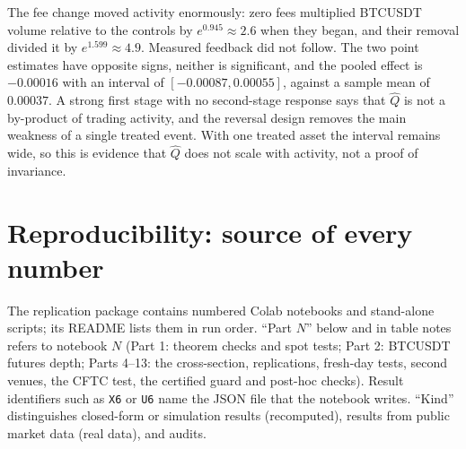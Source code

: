 \documentclass[12pt]{article}
\theoremstyle{definition}
\theoremstyle{remark}
\begin{document}
The fee change moved activity enormously: zero fees multiplied BTCUSDT volume relative to the controls by $e^{0.945}\approx2.6$ when they began, and their removal divided it by $e^{1.599}\approx4.9$. Measured feedback did not follow. The two point estimates have opposite signs, neither is significant, and the pooled effect is $-0.00016$ with an interval of $[-0.00087,0.00055]$, against a sample mean of $0.00037$. A strong first stage with no second-stage response says that $\hat Q$ is not a by-product of trading activity, and the reversal design removes the main weakness of a single treated event. With one treated asset the interval remains wide, so this is evidence that $\hat Q$ does not scale with activity, not a proof of invariance.

\section{Reproducibility: source of every number}\label{app:repro}

The replication package contains numbered Colab notebooks and stand-alone scripts; its README lists them in run order. ``Part $N$'' below and in table notes refers to notebook $N$ (Part 1: theorem checks and spot tests; Part 2: BTCUSDT futures depth; Parts 4--13: the cross-section, replications, fresh-day tests, second venues, the CFTC test, the certified guard and post-hoc checks). Result identifiers such as \texttt{X6} or \texttt{U6} name the JSON file that the notebook writes. ``Kind'' distinguishes closed-form or simulation results (recomputed), results from public market data (real data), and audits.
\end{document}
